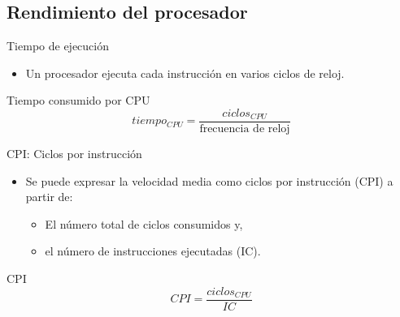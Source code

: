 \subsection{Rendimiento del procesador}

\begin{frame}[t]{Tiempo de ejecución}
\begin{itemize}
  \item Un procesador ejecuta cada instrucción en varios ciclos de reloj.
\end{itemize}
\begin{block}{Tiempo consumido por CPU}
\begin{displaymath}
tiempo_{CPU} = 
\frac{ciclos_{CPU}}{\text{frecuencia de reloj}}
\end{displaymath}
\end{block}
\end{frame}

\begin{frame}[t]{CPI: Ciclos por instrucción}
  \begin{itemize}
    \item Se puede expresar la velocidad media como ciclos por instrucción (CPI) a partir de:
      \begin{itemize}
         \item El número total de ciclos consumidos y,
         \item el número de instrucciones ejecutadas (IC).
      \end{itemize}
  \end{itemize}
\begin{block}{CPI}
\begin{displaymath}
CPI =
\frac{ciclos_{CPU}}{IC}
\end{displaymath}
\end{block}
\end{frame}

